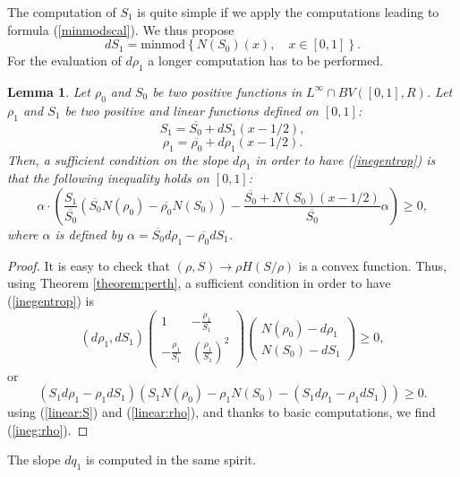 \documentclass{fldauth}
\theoremstyle{plain}
\theoremstyle{plain}
\newtheorem{lem}{Lemma}
\theoremstyle{plain}
\theoremstyle{plain}
\theoremstyle{plain}
\theoremstyle{plain}
\newtheorem{proof}{Proof}
\begin{document}
The computation of \( S_{1} \) is quite simple if we apply the computations
leading to formula (\ref{minmodscal}). We thus propose
\begin{equation}
\label{minmodS}
dS_{1}=\textrm{minmod}\left\{ N(S_{0})(x),\quad x\in [0,1]\right\} .
\end{equation}
For the evaluation of \( d\rho _{1} \) a longer computation has to be performed.

\begin{lem}
Let \( \rho _{0} \) and \( S_{0} \) be two positive functions in \( L^{\infty }\cap BV([0,1],R) \).
Let \( \rho _{1} \) and \( S_{1} \) be two positive and linear functions defined
on \( [0,1] \):
\begin{equation}
\label{linear:S}
S_{1}=\overline{S_{0}}+dS_{1}(x-1/2),
\end{equation}
\begin{equation}
\label{linear:rho}
\rho _{1}=\overline{\rho _{0}}+d\rho _{1}(x-1/2).
\end{equation}
Then, a sufficient condition on the slope \( d\rho _{1} \) in order to have
(\ref{inegentrop}) is that the following inequality holds on \( [0,1] \):
\begin{equation}
\label{ineg:rho}
\alpha \cdot \left( \frac{S_{1}}{\overline{S_{0}}}(\overline{S_{0}}N(\rho _{0})-\overline{\rho _{0}}N(S_{0}))-\frac{\overline{S_{0}}+N(S_{0})(x-1/2)}{\overline{S_{0}}}\alpha \right) \geq 0,
\end{equation}
where \( \alpha  \) is defined by \( \alpha =\overline{S_{0}}d\rho _{1}-\overline{\rho _{0}}dS_{1} \).
\end{lem}
\begin{proof}
It is easy to check that \( (\rho ,S)\rightarrow \rho H(S/\rho )
\) is a convex function. Thus, using Theorem \ref{theorem:perth},
a sufficient condition in order to have (\ref{inegentrop}) is
\[
(d\rho _{1},dS_{1})\left( \begin{array}{cc}
1 & -\frac{\rho _{1}}{S_{1}}\\
-\frac{\rho _{1}}{S_{1}} & \left( \frac{\rho _{1}}{S_{1}}\right) ^{2}
\end{array}\right) \left( \begin{array}{c}
N(\rho _{0})-d\rho _{1}\\
N(S_{0})-dS_{1}
\end{array}\right) \geq 0,\]
or
\[
(S_{1}d\rho _{1}-\rho _{1}dS_{1})(S_{1}N(\rho _{0})-\rho _{1}N(S_{0})-(S_{1}d\rho _{1}-\rho _{1}dS_{1}))\geq 0.\]
using (\ref{linear:S}) and (\ref{linear:rho}), and thanks to basic computations,
we find (\ref{ineg:rho}).
\end{proof}
The slope \( dq_{1} \) is computed in the same spirit.
\end{document}
